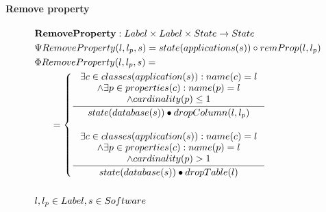 \documentclass[11pt]{article}
\begin{document}
\paragraph{Remove property}
\begin{align*}
&	\mathbf{RemoveProperty} : Label \times Label \times State \rightarrow State \\
&	\Psi RemoveProperty(l, l_p, s) =  state(applications(s)) \circ  remProp(l, l_p) \\
&	\Phi RemoveProperty(l, l_p, s) = \\
& \;\;\;\;\;\; =\begin{cases}
		 \inference{\exists c \in classes(application(s)) : name(c) = l\\ 
		\wedge \exists p \in properties(c) : name(p) = l \\ \wedge cardinality(p) \leq 1}{state(database(s)) \bullet dropColumn(l, l_p)}  \\\\
		 \inference{\exists c \in classes(application(s)) : name(c) = l\\ 
		\wedge \exists p \in properties(c)  : name(p) = l \\ \wedge cardinality(p)>1}{state(database(s)) \bullet dropTable(l)}
 	\end{cases}\\\\
&	l, l_p \in Label, s \in Software
\end{align*}
\end{document}
